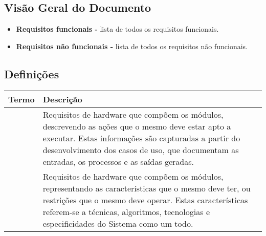 \documentclass{article}
\begin{document}
	\newpage
	
	\tableofcontents
	\newpage
	
	    
	
	\subsection{Visão Geral do Documento}
	  \begin{itemize}
	   \item \textbf{Requisitos funcionais -} lista de todos os requisitos funcionais.
	   \item \textbf{Requisitos não funcionais -} lista de todos os requisitos não funcionais.
	  \end{itemize}
	
	  \subsection{Definições}
	  
	  \FloatBarrier
	  \begin{table}[H]
	    \begin{center}
	      \begin{tabular}[pos]{|m{2.5cm} | m{11.5cm}|} 
	        \hline
	        \cellcolor[gray]{0.9}\textbf{Termo} & \cellcolor[gray]{0.9}\textbf{Descrição} \\ \hline
	        \flushright \centering {Requisito Funcional} & Requisitos de hardware que compõem os módulos, descrevendo as ações que o 
	                                    mesmo deve estar apto a executar. Estas informações são capturadas a partir 
	                                    do desenvolvimento dos casos de uso, que documentam as entradas, os processos 
	                                    e as saídas geradas.  \\ \hline
	        \flushright \centering {Requisito Não \mbox{Funcional}} & Requisitos de hardware que compõem os módulos, representando as características 
	                                    que o mesmo deve ter, ou restrições que o mesmo deve operar. Estas características
	                                    referem-se a técnicas, algoritmos, tecnologias e especificidades do Sistema como um todo.  \\ \hline
	      \end{tabular}
	    \end{center}
	  \end{table}  
	
\end{document}

